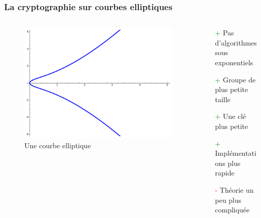 \documentclass[9pt]{beamer}
\begin{document}
\begin{frame}
    \frametitle{La cryptographie sur courbes elliptiques}
    \begin{columns}[tb]
        \begin{column}{0.35\linewidth}
            \vfill
            \begin{figure}
                \begin{center}
                    \includegraphics[scale=0.18]{ecc.png}
                \end{center}
                \caption{Une courbe elliptique}
            \end{figure}
        \end{column}
        \begin{column}{0.6\linewidth}
            \begin{itemize}
                \item[\textcolor{green}{+}] Pas d'algorithmes sous exponentiels
                    \vfill
                    \pause
                \item[\textcolor{green}{+}] Groupe de plus petite taille
                    \vfill
                    \pause
                \item[\textcolor{green}{+}] Une clé plus petite
                    \vfill
                    \pause
                \item[\textcolor{green}{+}] Implémentations plus rapide
                    \vfill
                    \pause
                \item[\textcolor{red}{-}] Théorie un peu plus compliquée
            \end{itemize}
        \end{column}
    \end{columns}
\end{frame}
\end{document}

